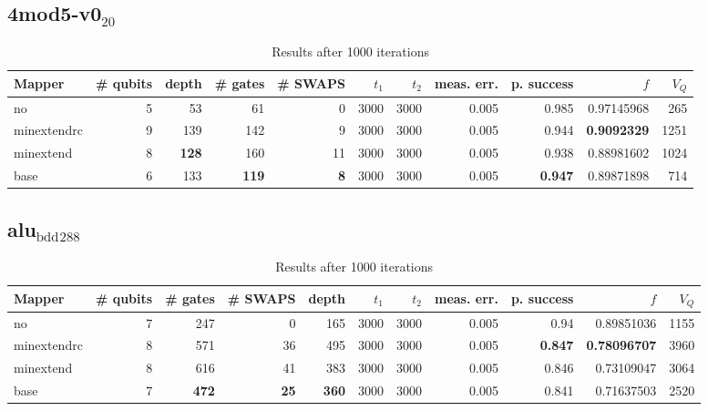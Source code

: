 \documentclass[11pt]{article}
\begin{document}
\subsection{4mod5-v0\(_{\text{20}}\)}
\label{sec:orgec0b480}
\begin{table}[H]
\caption{\label{tab:org67dc822}
Results after 1000 iterations}
\centering
\small
\begin{tabular}{lrrrrrrrrrr}
\hline
Mapper & \# qubits & depth & \# gates & \# SWAPS & \(t_1\) & \(t_2\) & meas. err. & p. success & \(f\) & \(V_Q\)\\
\hline
no & 5 & 53 & 61 & 0 & 3000 & 3000 & 0.005 & 0.985 & 0.97145968 & 265\\
\hline
minextendrc & 9 & 139 & 142 & 9 & 3000 & 3000 & 0.005 & 0.944 & \textbf{0.9092329} & 1251\\
minextend & 8 & \textbf{128} & 160 & 11 & 3000 & 3000 & 0.005 & 0.938 & 0.88981602 & 1024\\
base & 6 & 133 & \textbf{119} & \textbf{8} & 3000 & 3000 & 0.005 & \textbf{0.947} & 0.89871898 & 714\\
\hline
\end{tabular}
\end{table}

\subsection{alu\(_{\text{bdd}}\)\(_{\text{288}}\)}
\label{sec:orge16e335}

\begin{table}[H]
\caption{\label{tab:orge5937ce}
Results after 1000 iterations}
\centering
\small
\begin{tabular}{lrrrrrrrrrr}
\hline
Mapper & \# qubits & \# gates & \# SWAPS & depth & \(t_1\) & \(t_2\) & meas. err. & p. success & \(f\) & \(V_Q\)\\
\hline
no & 7 & 247 & 0 & 165 & 3000 & 3000 & 0.005 & 0.94 & 0.89851036 & 1155\\
\hline
minextendrc & 8 & 571 & 36 & 495 & 3000 & 3000 & 0.005 & \textbf{0.847} & \textbf{0.78096707} & 3960\\
minextend & 8 & 616 & 41 & 383 & 3000 & 3000 & 0.005 & 0.846 & 0.73109047 & 3064\\
base & 7 & \textbf{472} & \textbf{25} & \textbf{360} & 3000 & 3000 & 0.005 & 0.841 & 0.71637503 & 2520\\
\hline
\end{tabular}
\end{table}
\end{document}
